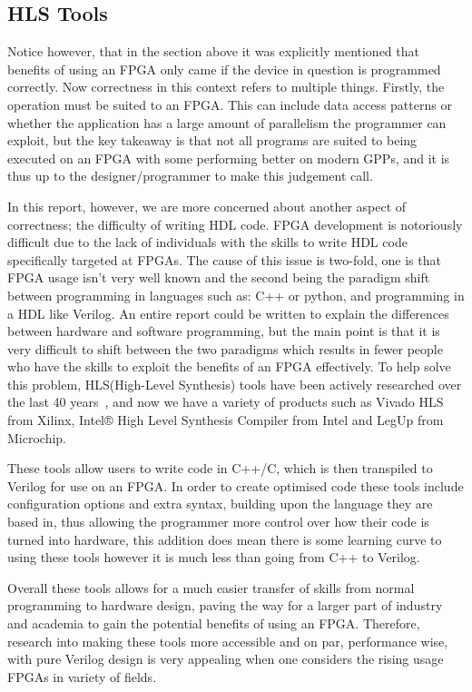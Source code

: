 \subsection{HLS Tools}

Notice however, that in the section above it was explicitly mentioned that benefits of using an FPGA only came if the device in question is programmed correctly. Now correctness in this context refers to multiple things. Firstly, the operation must be suited to an FPGA. This can include data access patterns or whether the application has a large amount of parallelism the programmer can exploit, but the key takeaway is that not all programs are suited to being executed on an FPGA with some performing better on modern GPPs, and it is thus up to the designer/programmer to make this judgement call.

In this report, however, we are more concerned about another aspect of correctness; the difficulty of writing HDL code. FPGA development is notoriously difficult due to the lack of individuals with the skills to write HDL code specifically targeted at FPGAs. The cause of this issue is two-fold, one is that FPGA usage isn't very well known and the second being the paradigm shift between programming in languages such as: C++ or python, and programming in a HDL like Verilog. An entire report could be written to explain the differences between hardware and software programming, but the main point is that it is very difficult to shift between the two paradigms which results in fewer people who have the skills to exploit the benefits of an FPGA effectively. To help solve this problem, HLS(High-Level Synthesis) tools have been actively researched over the last 40 years~\cite{5209959}, and now we have a variety of products such as Vivado HLS from Xilinx, Intel® High Level Synthesis Compiler from Intel and LegUp from Microchip.

These tools allow users to write code in C++/C, which is then transpiled to Verilog for use on an FPGA. In order to create optimised code these tools include configuration options and extra syntax, building upon the language they are based in, thus allowing the programmer more control over how their code is turned into hardware, this addition does mean there is some learning curve to using these tools however it is much less than going from C++ to Verilog. 

Overall these tools allows for a much easier transfer of skills from normal programming to hardware design, paving the way for a larger part of industry and academia to gain the potential benefits of using an FPGA. Therefore, research into making these tools more accessible and on par, performance wise, with pure Verilog design is very appealing when one considers the rising usage FPGAs in variety of fields\cite{fpga-market}.

